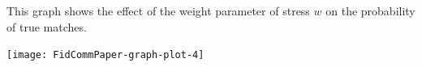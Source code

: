 \documentclass[11pt]{article} %
\begin{document}

This graph shows the effect of the weight parameter of stress $w$ on the probability of true matches.

\texttt{[image: FidCommPaper-graph-plot-4]}
\end{document}
